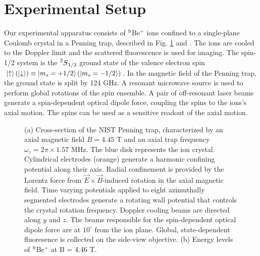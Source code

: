 \documentclass[aps,prl,twocolumn,superscriptaddress,floatfix]{revtex4-1}
\begin{document}
\section{Experimental Setup}
Our experimental apparatus consists of $\prescript{9}{}{}$Be$^{+}$ ions confined to a single-plane Coulomb crystal in a Penning trap, described in Fig. \ref{Fig 1} and \citep{Bohnet2015a}. The ions are cooled to the Doppler limit and the scattered fluorescence is used for imaging. The spin-1/2 system is the $\prescript{2}{}{S}_{1/2}$ ground state of the valence electron spin $\ket{\uparrow} (\ket{\downarrow}) \equiv \ket{m_{s}=+1/2} (\ket{m_{s}=-1/2}) $. In the magnetic field of the Penning trap, the ground state is split by 124 GHz. A resonant microwave source is used to perform global rotations of the spin ensemble. A pair of off-resonant laser beams generate a spin-dependent optical dipole force, coupling the spins to the ions's axial motion. The spins can be used as a sensitive readout of the axial motion.
\begin{figure}[h]
  \hfill
  \hfill
  \caption{(a) Cross-section of the NIST Penning trap, characterized by an axial magnetic field $B = 4.45$ T and an axial trap frequency $\omega_z = 2\pi \times 1.57$ MHz. The blue disk represents the ion crystal. Cylindrical electrodes (orange) generate a harmonic confining potential along their axis. Radial confinement is provided by the Lorentz force from $\vec{E} \times \vec{B}$-induced rotation in the axial magnetic field. Time varying potentials applied to eight azimuthally segmented electrodes generate a rotating wall potential that controls the crystal rotation frequency. Doppler cooling beams are directed along $y$ and $z$. The beams responsible for the spin-dependent optical dipole force are at $10^{\circ} $ from the ion plane. Global, state-dependent fluoresence is collected on the side-view objective. (b) Energy levels of $\prescript{9}{}{}$Be$^{+}$ at B = 4.46 T.}\label{Fig 1}
\end{figure}
\end{document}
